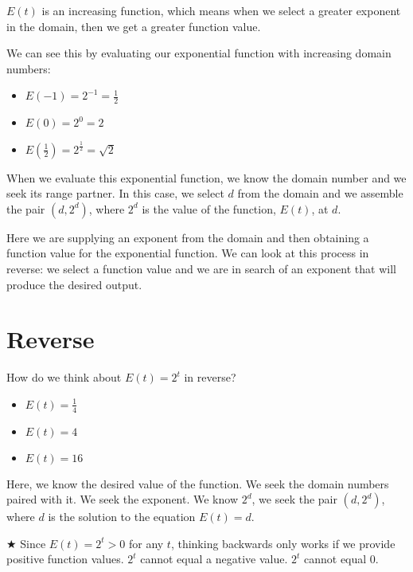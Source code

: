 \documentclass{ximera}
\begin{document}
$E(t)$ is an increasing function, which means when we select a greater exponent in the domain, then we get a greater function value.  



We can see this by evaluating our exponential function with increasing domain numbers:
\begin{itemize}
\item $E(-1) = 2^{-1} = \frac{1}{2}$
\item $E(0) = 2^0 = 2$
\item $E\left(\frac{1}{2}\right) = 2^{\tfrac{1}{2}} = \sqrt{2}$
\end{itemize}


When we evaluate this exponential function, we know the domain number and we seek its range partner. In this case, we select $d$ from the domain and we assemble the pair $(d, 2^d)$, where $2^d$ is the value of the function, $E(t)$, at $d$.



Here we are supplying an exponent from the domain and then obtaining a function value for the exponential function.  We can look at this process in reverse: we select a function value and we are in search of an exponent that will produce the desired output.









\section{Reverse}

How do we think about $E(t) = 2^t$ in reverse?
\begin{itemize}
\item $E(t) = {\tfrac{1}{4}} $
\item $E(t) = 4$
\item $E(t) = 16 $
\end{itemize}


Here, we know the desired value of the function.  We seek the domain numbers paired with it. We seek the exponent. We know $2^d$, we seek the pair $(d, 2^d)$, where $d$ is the solution to the equation $E(t) = d$.




\textbf{\textcolor{red!90!darkgray}{$\bigstar$}}  Since $E(t) = 2^t > 0$ for any $t$, thinking backwards only works if we provide positive function values. $2^t$ cannot equal a negative value. $2^t$ cannot equal $0$.   \\ 
\end{document}
